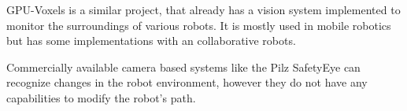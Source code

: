 GPU-Voxels \cite{GPU-Voxels} is a similar project, that already has a vision system implemented to monitor the surroundings of various robots. It is mostly used in mobile robotics but has some implementations with an collaborative robots.

Commercially available camera based systems like the Pilz SafetyEye \cite{pilz} can recognize changes in the robot environment, however they do not have any capabilities to modify the robot's path.

